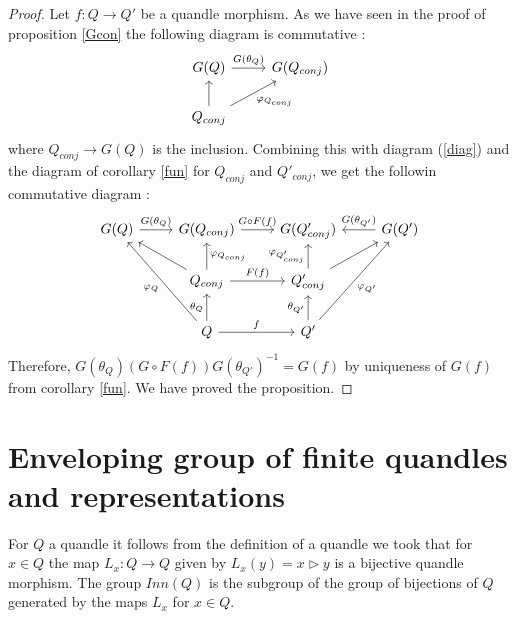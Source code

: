 \documentclass[12pt, reqno]{amsart}
\begin{document}
\begin{proof}
Let $f:Q\to Q'$ be a quandle morphism. As we have seen in the proof of proposition \ref{Gcon} the following diagram is commutative :
 $$\begin{tikzcd}
G(Q) \arrow{r}{G(\theta_Q)} &G(Q_{conj})  \\ 
Q_{conj}\arrow{u} \arrow[swap]{ru}{\varphi_{Q_{conj}}} &  
\end{tikzcd} $$
where $Q_{conj}\to G(Q)$ is the inclusion. Combining this with diagram (\ref{diag}) and the diagram of corollary \ref{fun} for $Q_{conj}$ and $Q'_{conj}$, we get the followin commutative diagram :
$$\begin{tikzcd}
G(Q) \arrow{r}{G(\theta_Q)} & G(Q_{conj}) \arrow{r}{G\circ F (f)} &G(Q'_{conj}) & \arrow[swap]{l}{G(\theta_{Q'})} G(Q')  \\ 
&\arrow{ul}Q_{conj}\arrow[swap]{u}{\varphi_{Q_{conj}}} \arrow{r}{F(f)}  &  Q'_{conj}\arrow{u}{\varphi_{Q'_{conj}}}\arrow[swap]{ur}& \\
&\arrow{uul}{\varphi_{Q}}Q\arrow{u}{\theta_Q}\arrow{r}{f}    &  Q'\arrow{u}{\theta_{Q'}}\arrow[swap]{uur}{\varphi_{Q'}}&
\end{tikzcd} $$
Therefore, $G(\theta_Q)( G\circ F (f) )G(\theta_{Q'})^{-1}=G(f)$ by uniqueness of $G(f)$ from corollary \ref{fun}. We have proved the proposition.
\end{proof}

\section{Enveloping group of finite quandles and representations}
For $Q$ a quandle it follows from the definition of a quandle we took that for $x\in Q$  the map $L_x: Q\to Q$ given by $L_x(y)=x\triangleright y$ is a bijective quandle morphism. The group $Inn(Q)$ is the subgroup of the group of bijections of $Q$ generated by the maps $L_x$ for $x\in Q$. 
\end{document}
